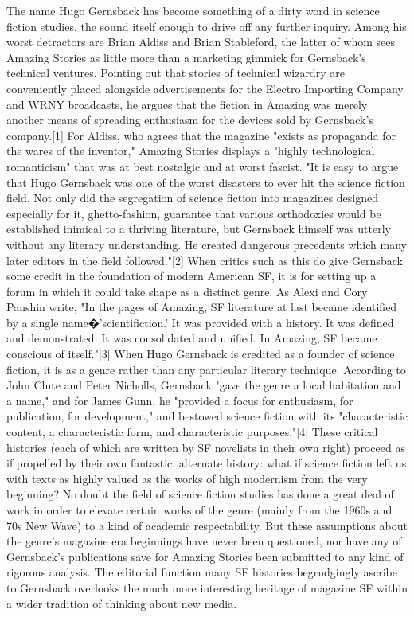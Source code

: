 \documentclass{article}
\begin{document}
The name Hugo Gernsback has become something of a dirty word in science fiction studies, the sound itself enough to drive off any further inquiry.  Among his worst detractors are Brian Aldiss and Brian Stableford, the latter of whom sees Amazing Stories as little more than a marketing gimmick for Gernsback's technical ventures.  Pointing out that stories of technical wizardry are conveniently placed alongside advertisements for the Electro Importing Company and WRNY broadcasts, he argues that the fiction in Amazing was merely another means of spreading enthusiasm for the devices sold by Gernsback's company.[1]  For Aldiss, who agrees that the magazine "exists as propaganda for the wares of the inventor," Amazing Stories displays a "highly technological romanticism" that was at best nostalgic and at worst fascist.  "It is easy to argue that Hugo Gernsback was one of the worst disasters to ever hit the science fiction field.  Not only did the segregation of science fiction into magazines designed especially for it, ghetto-fashion, guarantee that various orthodoxies would be established inimical to a thriving literature, but Gernsback himself was utterly without any literary understanding.  He created dangerous precedents which many later editors in the field followed."[2]  When critics such as this do give Gernsback some credit in the foundation of modern American SF, it is for setting up a forum in which it could take shape as a distinct genre.  As Alexi and Cory Panshin write, "In the pages of Amazing, SF literature at last became identified by a single name�'scientifiction.'  It was provided with a history.  It was defined and demonstrated.  It was consolidated and unified.  In Amazing, SF became conscious of itself."[3]  When Hugo Gernsback is credited as a founder of science fiction, it is as a genre rather than any particular literary technique.  According to John Clute and Peter Nicholls, Gernsback "gave the genre a local habitation and a name," and for James Gunn, he "provided a focus for enthusiasm, for publication, for development," and bestowed science fiction with its "characteristic content, a characteristic form, and characteristic purposes."[4]
	These critical histories (each of which are written by SF novelists in their own right) proceed as if propelled by their own fantastic, alternate history:  what if science fiction left us with texts as highly valued as the works of high modernism from the very beginning?  No doubt the field of science fiction studies has done a great deal of work in order to elevate certain works of the genre (mainly from the 1960s and 70s New Wave) to a kind of academic respectability.  But these assumptions about the genre's magazine era beginnings have never been questioned, nor have any of Gernsback's publications save for Amazing Stories been submitted to any kind of rigorous analysis.  The editorial function many SF histories begrudgingly ascribe to Gernsback overlooks the much more interesting heritage of magazine SF within a wider tradition of thinking about new media. 
\end{document}
